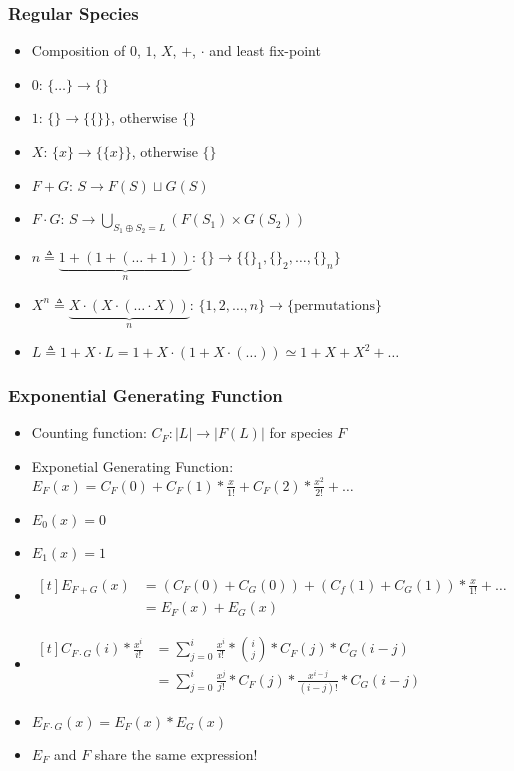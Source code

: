 \begin{frame}
\frametitle{Regular Species}

\begin{itemize}[<+->]
\item Composition of $0$, $1$, $X$, $+$, $\cdot$ and least fix-point
\item $0$: $\{\dots\} \rightarrow \{\}$
\item $1$: $\{\} \rightarrow \{\{\}\}$, otherwise $\{\}$
\item $X$: $\{x\} \rightarrow \{\{x\}\}$, otherwise $\{\}$
\item $F + G$: $S \rightarrow F(S) \sqcup G(S)$
\item $F \cdot G$: $S \rightarrow \bigcup\limits_{S_1 \oplus S_2=L}(F(S_1) \times G(S_2))$
\item $n \triangleq \underbrace{1 + (1 + (\ldots + 1))}_n$:
$\{\} \rightarrow \{\{\}_1, \{\}_2, \ldots, \{\}_n\}$
\item $X^n \triangleq \underbrace{X \cdot (X \cdot (\ldots \cdot X))}_n$:
$\{1, 2, \ldots, n\} \rightarrow \{\text{permutations}\}$
\item $L \triangleq 1 + X \cdot L = 1 + X \cdot (1 + X \cdot (\ldots)) \simeq 1 + X + X^2 + \ldots$
\end{itemize}
\end{frame}

\begin{frame}
\frametitle{Exponential Generating Function}

\begin{itemize}
\item Counting function: $C_F: |L| \rightarrow |F(L)|$ for species $F$
\item Exponetial Generating Function: $E_F(x) = C_F(0) + C_F(1)*\frac{x}{1!} + C_F(2)*\frac{x^2}{2!} + \ldots$
\item \color{gray} $E_0(x) = 0$
\item $E_1(x) = 1$
\item
$\begin{aligned}[t]
E_{F+G}(x) &= (C_F(0)+C_G(0)) + (C_f(1)+C_G(1))*\frac{x}{1!} + \ldots\\
&= E_F(x) + E_G(x)
\end{aligned}$

\item $
\begin{aligned}[t]
C_{F\cdot G}(i)*\frac{x^i}{i!} 
&= \sum\limits_{j=0}^i \frac{x^i}{i!} * \binom{i}{j}*C_F(j)*C_G(i-j)\\
&= \sum\limits_{j=0}^i \frac{x^j}{j!}*C_F(j) * \frac{x^{i-j}}{(i-j)!}*C_G(i-j)
\end{aligned}$
\item $E_{F\cdot G}(x) = E_F(x) * E_G(x)$
\item \color{black} $E_F$ and $F$ share the same expression!
\end{itemize}
\end{frame}

